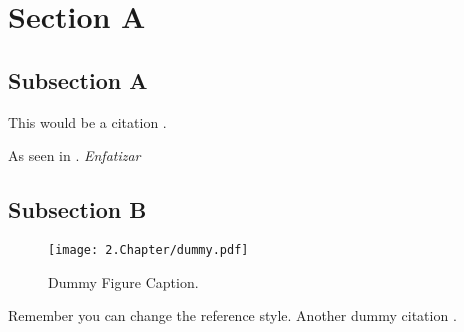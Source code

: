 \section{Section A}
\label{sec:sectiona}

\subsection{Subsection A}
\label{subsec:subasectionA}

This would be a citation \cite{dummy}.

As seen in \cite{wiki}. \emph{Enfatizar}

\subsection{Subsection B}
\label{subsec:subbsectiona}

\begin{figure}[H]
	\centering
		\texttt{[image: 2.Chapter/dummy.pdf]}
	\caption[Dummy Figure Caption for List of Figures.]{Dummy Figure Caption.}
	\label{fig:dummyfigure1}
\end{figure}

Remember you can change the reference style. Another dummy citation \cite{site}.